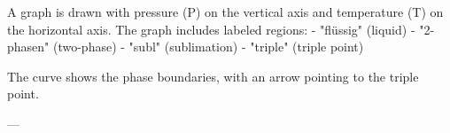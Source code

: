 A graph is drawn with pressure (P) on the vertical axis and temperature (T) on the horizontal axis. The graph includes labeled regions:  
- "flüssig" (liquid)  
- "2-phasen" (two-phase)  
- "subl" (sublimation)  
- "triple" (triple point)  

The curve shows the phase boundaries, with an arrow pointing to the triple point.

---